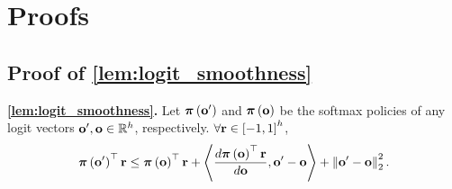 \section{Proofs}

\subsection{Proof of \cref{lem:logit_smoothness}}

{\bf \cref{lem:logit_smoothness}.} Let ${\boldsymbol{\pi}}\left( {\mathbf{o}}^\prime \right)$ and ${\boldsymbol{\pi}}\left( {\mathbf{o}} \right)$ be the softmax policies of any logit vectors ${\mathbf{o}}^\prime, {\mathbf{o}} \in {\mathbb{R}}^h$, respectively. $\forall {\mathbf{r}} \in \left[ -1, 1\right]^h$,
\begin{equation*}
    {\boldsymbol{\pi}}\left( {\mathbf{o}}^\prime \right)^\top {\mathbf{r}} \le {\boldsymbol{\pi}}\left( {\mathbf{o}} \right)^\top {\mathbf{r}} + \left\langle \frac{d {\boldsymbol{\pi}}\left( {\mathbf{o}} \right)^\top {\mathbf{r}}}{d {\mathbf{o}}}, {\mathbf{o}}^\prime - {\mathbf{o}} \right\rangle + \left\| {\mathbf{o}}^\prime - {\mathbf{o}} \right\|_2^2.
\end{equation*}
